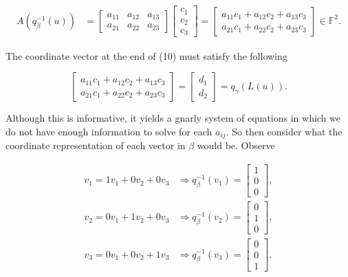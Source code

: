 \documentclass[12pt, a4paper]{article}
\begin{document}
 \begin{equation}
    \begin{split}
         A(q_{\beta}^{-1}(u)) &= \begin{bmatrix} a_{11} & a_{12} & a_{13} \\ a_{21} & a_{22} & a_{23} \end{bmatrix}\begin{bmatrix} c_1 \\ c_2 \\ c_3 \end{bmatrix}=\begin{bmatrix} a_{11}c_1+a_{12}c_2+a_{13}c_3 \\ a_{21}c_1+a_{22}c_2+a_{23}c_3 \end{bmatrix}\in\mathbb{F}^2.
     \end{split}
 \end{equation}
 
 \vspace{2mm}
 
 \noindent The coordinate vector at the end of (10) must satisfy the following
 
 \begin{equation}
     \begin{bmatrix} a_{11}c_1+a_{12}c_2+a_{13}c_3 \\ a_{21}c_1+a_{22}c_2+a_{23}c_3 \end{bmatrix} = \begin{bmatrix} d_1 \\ d_2 \end{bmatrix} = q_{\gamma}(L(u)).
 \end{equation}
 
 \vspace{2mm}
 
 \noindent Although this is informative, it yields a gnarly system of equations in which we do not have enough information to solve for each $a_{ij}$. So then consider what the coordinate representation of each vector in $\beta$ would be. Observe
 
 \begin{equation*}
    \begin{split}
        v_1=1v_1+0v_2+0v_3 &\Rightarrow q_{\beta}^{-1}(v_1)=\begin{bmatrix} 1 \\ 0 \\ 0 \end{bmatrix}, \\
        v_2=0v_1+1v_2+0v_3 &\Rightarrow q_{\beta}^{-1}(v_2)=\begin{bmatrix} 0 \\ 1 \\ 0 \end{bmatrix}, \\
        v_3=0v_1+0v_2+1v_3 &\Rightarrow q_{\beta}^{-1}(v_3)=\begin{bmatrix} 0 \\ 0 \\ 1 \end{bmatrix}.
    \end{split}
 \end{equation*}
 
\end{document}
